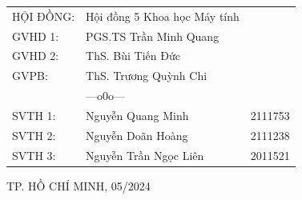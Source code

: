 \begin{titlepage}
    \vspace{1.5cm}
    \begin{table}[h!]
        \raggedleft
        \bfseries
        \renewcommand{\arraystretch}{1.2}
        \fontsize{15pt}{15pt}\selectfont
        \begin{tabular}{llc}
            HỘI ĐỒNG:   & Hội đồng 5 Khoa học Máy tính &\\
            GVHD 1:     & PGS.TS Trần Minh Quang \\
            GVHD 2:     & ThS. Bùi Tiến Đức  \\
            GVPB:       & ThS. Trương Quỳnh Chi \\
            
            & \quad\quad---o0o--- &  \\
            SVTH 1:     & Nguyễn Quang Minh      & 2111753 \\
            SVTH 2:     & Nguyễn Doãn Hoàng      & 2111238 \\
            SVTH 3:     & Nguyễn Trần Ngọc Liên  & 2011521 \\
        \end{tabular}
    \end{table}
    
    \begin{center}
        \vspace{1cm}\fontsize{14pt}{9pt}\selectfont
        
        TP. HỒ CHÍ MINH, 05/2024
    \end{center}
\end{titlepage}
